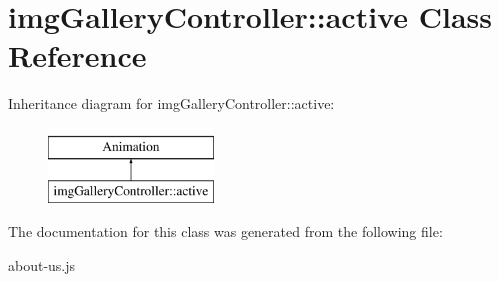 \hypertarget{classimgGalleryController_1_1active}{\section{img\-Gallery\-Controller\-:\-:active Class Reference}
\label{classimgGalleryController_1_1active}
}
Inheritance diagram for img\-Gallery\-Controller\-:\-:active\-:\begin{figure}[H]
\begin{center}
\leavevmode
\includegraphics[height=2.000000cm]{classimgGalleryController_1_1active}
\end{center}
\end{figure}


The documentation for this class was generated from the following file\-:\begin{DoxyCompactItemize}
\item 
about-\/us.\-js\end{DoxyCompactItemize}
